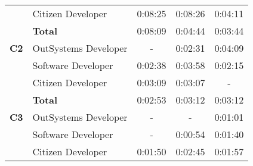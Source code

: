 \begin{table}[tb]
\begin{tabular}{llrrr}
                            & Citizen Developer    & 0:08:25                                                           & 0:08:26                                                                 & 0:04:11                                                       \\
                            & \textbf{Total}       & 0:08:09                                                           & 0:04:44                                                                 & 0:03:44                                                       \\ \hline
  \textbf{C2}               & OutSystems Developer & \multicolumn{1}{c}{-}                                             & 0:02:31                                                                 & 0:04:09                                                       \\
                            & Software Developer   & 0:02:38                                                           & 0:03:58                                                                 & 0:02:15                                                       \\
                            & Citizen Developer    & 0:03:09                                                           & 0:03:07                                                                 & \multicolumn{1}{c}{-}                                         \\
                            & \textbf{Total}       & 0:02:53                                                           & 0:03:12                                                                 & 0:03:12                                                       \\ \hline
  \textbf{C3}               & OutSystems Developer & \multicolumn{1}{c}{-}                                             & \multicolumn{1}{c}{-}                                                   & 0:01:01                                                       \\
                            & Software Developer   & \multicolumn{1}{c}{-}                                             & 0:00:54                                                                 & 0:01:40                                                       \\
                            & Citizen Developer    & 0:01:50                                                           & 0:02:45                                                                 & 0:01:57                                                       \\

\end{tabular}
\end{table}
